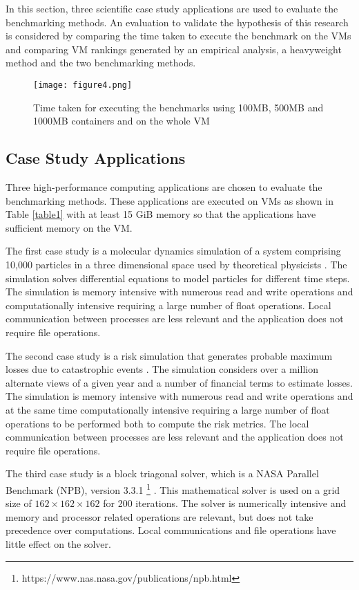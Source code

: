 In this section, three scientific case study applications are used to evaluate the benchmarking methods. An evaluation to validate the hypothesis of this research is considered by comparing the time taken to execute the benchmark on the VMs and comparing VM rankings generated by an empirical analysis, a heavyweight method and the two benchmarking methods. 

\begin{figure*}[ht]
	\centering
	\texttt{[image: figure4.png]}
	\caption{Time taken for executing the benchmarks using 100MB, 500MB and 1000MB containers and on the whole VM}
	\label{evaluation:feasibility}
\end{figure*}

\subsection{Case Study Applications}
\label{studies:casestudy}
Three high-performance computing applications are chosen to evaluate the benchmarking methods. These applications are executed on VMs as shown in Table \ref{table1} with at least 15 GiB memory so that the applications have sufficient memory on the VM. 

The first case study is a molecular dynamics simulation of a system comprising 10,000 particles in a three dimensional space used by theoretical physicists \cite{md-1}. The simulation solves differential equations to model particles for different time steps. The simulation is memory intensive with numerous read and write operations and computationally intensive requiring a large number of float operations. Local communication between processes are less relevant and the application does not require file operations. 

The second case study is a risk simulation that generates probable maximum losses due to catastrophic events \cite{risk-1}. The simulation considers over a million alternate views of a given year and a number of financial terms to estimate losses. The simulation is memory intensive with numerous read and write operations and at the same time computationally intensive requiring a large number of float operations to be performed both to compute the risk metrics. The local communication between processes are less relevant and the application does not require file operations.

The third case study is a block triagonal solver, which is a NASA Parallel Benchmark (NPB), version 3.3.1
\footnote{https://www.nas.nasa.gov/publications/npb.html}
\cite{npb-1}. This mathematical solver is used on a grid size of $162 \times 162 \times 162$ for 200 iterations. The solver is numerically intensive and memory and processor related operations are relevant, but does not take precedence over computations. Local communications and file operations have little effect on the solver. 

